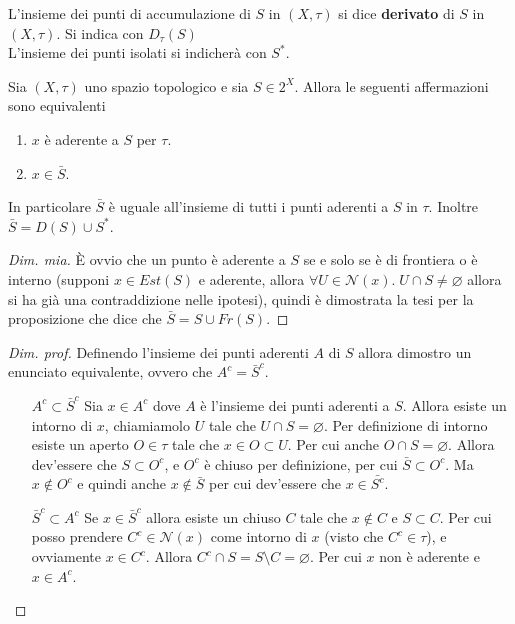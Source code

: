 \begin{definition}
	L'insieme dei punti di accumulazione di $S$ in $(X,\tau)$ si dice \textbf{derivato} di $S$ in $(X, \tau)$. 
	Si indica con $D_\tau (S)$\\
	L'insieme dei punti isolati si indicherà con $S^*$.
\end{definition}

\begin{theorem}
	\label{prop:aderent_points_are_in_closure}
	Sia $(X, \tau)$ uno spazio topologico e sia $S \in 2^X$. Allora le seguenti affermazioni sono equivalenti
	\begin{enumerate}
		\item $x$ è aderente a $S$ per $\tau$.
		\item $x \in \bar{S}$. 
	\end{enumerate}
	In particolare $\bar{S}$ è uguale all'insieme di tutti i punti aderenti a $S$ in $\tau$. Inoltre $\bar{S} = D(S) \cup S^*$.
\end{theorem}
\begin{proof}[Dim. mia]
	 È ovvio che un punto è aderente a $S$ se e solo se è di frontiera o è interno (supponi $x \in Est(S)$ e aderente, allora $\forall U \in \mathcal{N}(x).\; U \cap S \neq \varnothing$ allora si ha già una contraddizione nelle ipotesi), quindi è dimostrata la tesi per la proposizione che dice che $\bar{S} = S \cup Fr(S)$.
\end{proof}
\begin{proof}[Dim. prof]
	Definendo l'insieme dei punti aderenti $A$ di $S$ allora dimostro un enunciato equivalente, ovvero che $A^c = \bar{S}^c$.
	\begin{enumerate}
		\item[$A^c \subset \bar{S}^c$] Sia $x\in A^c$ dove $A$ è l'insieme dei punti aderenti a $S$. Allora esiste un intorno di $x$, chiamiamolo $U$ tale che $U \cap S = \varnothing$. Per definizione di intorno esiste un aperto $O \in \tau$ tale che $x \in O \subset U$. Per cui anche $O \cap S = \varnothing$. Allora dev'essere che $S \subset O^c$,  e $O^c$ è chiuso per definizione, per cui $\bar{S} \subset O^c$. Ma $x \notin O^c$ e quindi anche $x \notin \bar{S}$ per cui dev'essere che $x \in \bar{S^c}$.
		\item[$\bar{S}^c\subset A^c $] Se $x \in \bar{S}^c$ allora esiste un chiuso $C$ tale che $x \notin C$ e $S \subset C$. Per cui posso prendere $C^c \in \mathcal{N}(x)$ come intorno di $x$ (visto che $C^c \in \tau$), e ovviamente $x \in C^c$. Allora $C^c \cap S = S \setminus C = \varnothing$. Per cui $x$ non è aderente e $x \in A^c$.
	\end{enumerate}
\end{proof}

